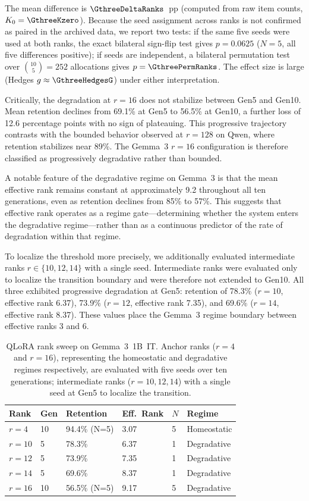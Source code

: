 \documentclass[a4paper,fleqn]{cas-dc}
\newif\ifshowchanges
\newcommand{\rev}[1]{\ifshowchanges{\color{blue}#1}\else{#1}\fi}
\begin{document}
\rev{The mean difference is $\GthreeDeltaRanks$~pp (computed from raw item counts,
$K_0=\GthreeKzero$). Because the seed assignment across ranks is not confirmed
as paired in the archived data, we report two tests: if the same five seeds were
used at both ranks, the exact bilateral sign-flip test gives $p=0.0625$
($N=5$, all five differences positive); if seeds are independent, a bilateral
permutation test over $\binom{10}{5}=252$ allocations gives
$p=\GthreePermRanks$. The effect size is large (Hedges $g \approx \GthreeHedgesG$)
under either interpretation.}

Critically, the degradation at $r=16$ does not stabilize between Gen5 and
Gen10. Mean retention declines from 69.1\% at Gen5 to 56.5\% at Gen10, a
further loss of 12.6 percentage points with no sign of plateauing. This
progressive trajectory contrasts with the bounded behavior observed at $r=128$
on Qwen, where retention stabilizes near 89\%. The Gemma~3 $r=16$
configuration is therefore classified as progressively degradative rather than
bounded.

A notable feature of the degradative regime on Gemma~3 is that the mean
effective rank remains constant at approximately 9.2 throughout all ten
generations, even as retention declines from 85\% to 57\%. This suggests that
effective rank operates as a regime gate---determining whether the system
enters the degradative regime---rather than as a continuous predictor of the
rate of degradation within that regime.

To localize the threshold more precisely, we additionally evaluated intermediate
ranks $r \in \{10, 12, 14\}$ with a single seed. Intermediate ranks were
evaluated only to localize the transition boundary and were therefore not
extended to Gen10. All three exhibited progressive
degradation at Gen5: retention of 78.3\% ($r=10$, effective rank 6.37), 73.9\%
($r=12$, effective rank 7.35), and 69.6\% ($r=14$, effective rank 8.37). These
values place the Gemma~3 regime boundary between effective ranks 3 and 6.

\begin{table}[width=.95\linewidth,cols=5,pos=htbp]
\caption{QLoRA rank sweep on Gemma~3~1B~IT. Anchor ranks ($r=4$ and $r=16$),
representing the homeostatic and degradative regimes respectively,
are evaluated with five seeds over ten generations; intermediate ranks
($r=10,12,14$) with a single seed at Gen5 to localize the transition.}\label{tab:gemma3}
\begin{tabular*}{\tblwidth}{@{} llllll@{} }
\toprule
Rank & Gen & Retention & Eff.\ Rank & \rev{$N$} & Regime \\
\midrule
$r=4$   & 10 & 94.4\% (N=5) & 3.07  & \rev{5} & Homeostatic \\
$r=10$  & 5  & 78.3\%       & 6.37  & \rev{1} & Degradative \\
$r=12$  & 5  & 73.9\%       & 7.35  & \rev{1} & Degradative \\
$r=14$  & 5  & 69.6\%       & 8.37  & \rev{1} & Degradative \\
$r=16$  & 10 & 56.5\% (N=5) & 9.17  & \rev{5} & Degradative \\
\bottomrule
\end{tabular*}
\end{table}
\end{document}

